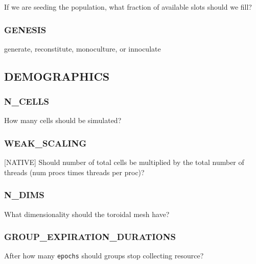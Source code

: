 
If we are seeding the population, what fraction of available slots should we fill?

\subsubsection{GENESIS}


generate, reconstitute, monoculture, or innoculate


\subsection{DEMOGRAPHICS}


\subsubsection{N\_CELLS}


How many cells should be simulated?

\subsubsection{WEAK\_SCALING}


[NATIVE] Should number of total cells be multiplied by the total number of threads (num procs times threads per proc)?

\subsubsection{N\_DIMS}


What dimensionality should the toroidal mesh have?

\subsubsection{GROUP\_EXPIRATION\_DURATIONS}


After how many \texttt{epochs} should groups stop collecting resource?

